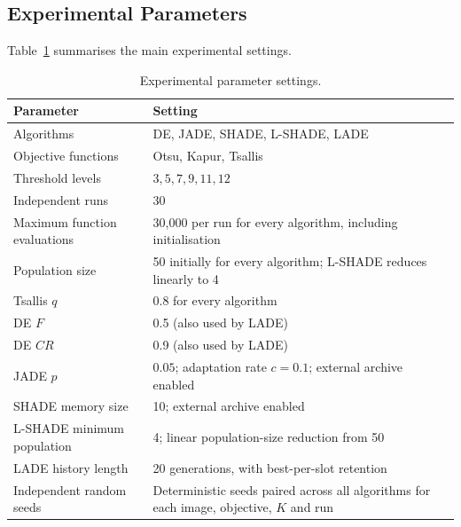 \documentclass[review]{elsarticle}
\begin{document}
\subsection{Experimental Parameters}

Table~\ref{tab:parameters} summarises the main experimental settings.

\begin{table}[H]
\caption{Experimental parameter settings.}
\label{tab:parameters}
\centering

\begin{tabular}{lp{}}
\toprule
\textbf{Parameter} & \textbf{Setting} \\
\midrule

Algorithms &
DE, JADE, SHADE, L-SHADE, LADE \\

Objective functions &
Otsu, Kapur, Tsallis \\

Threshold levels &
$3,5,7,9,11,12$ \\

Independent runs &
30 \\

Maximum function evaluations &
30,000 per run for every algorithm, including initialisation \\

Population size &
50 initially for every algorithm; L-SHADE reduces linearly to 4 \\

Tsallis $q$ &
0.8 for every algorithm \\

DE $F$ &
0.5 (also used by LADE) \\

DE $CR$ &
0.9 (also used by LADE) \\

JADE $p$ &
$0.05$; adaptation rate $c=0.1$; external archive enabled \\

SHADE memory size &
10; external archive enabled \\

L-SHADE minimum population &
4; linear population-size reduction from 50 \\

LADE history length &
20 generations, with best-per-slot retention \\

Independent random seeds &
Deterministic seeds paired across all algorithms for each image, objective, $K$ and run \\

\bottomrule
\end{tabular}

\end{table}
\end{document}
